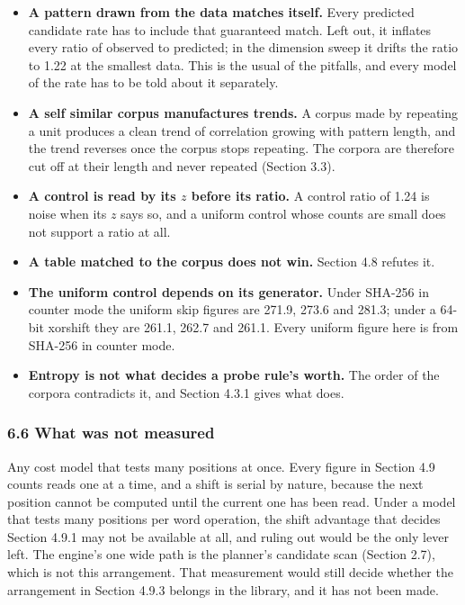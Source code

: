 \begin{itemize}
\item \textbf{A pattern drawn from the data matches itself.} Every predicted candidate rate has to include that guaranteed match. Left out, it inflates every ratio of observed to predicted; in the dimension sweep it drifts the ratio to 1.22 at the smallest data. This is the usual of the pitfalls, and every model of the rate has to be told about it separately.
\item \textbf{A self similar corpus manufactures trends.} A corpus made by repeating a unit produces a clean trend of correlation growing with pattern length, and the trend reverses once the corpus stops repeating. The corpora are therefore cut off at their length and never repeated (Section 3.3).
\item \textbf{A control is read by its \(z\) before its ratio.} A control ratio of 1.24 is noise when its \(z\) says so, and a uniform control whose counts are small does not support a ratio at all.
\item \textbf{A table matched to the corpus does not win.} Section 4.8 refutes it.
\item \textbf{The uniform control depends on its generator.} Under SHA-256 in counter mode the uniform skip figures are 271.9, 273.6 and 281.3; under a 64-bit xorshift they are 261.1, 262.7 and 261.1. Every uniform figure here is from SHA-256 in counter mode.
\item \textbf{Entropy is not what decides a probe rule's worth.} The order of the corpora contradicts it, and Section 4.3.1 gives what does.
\end{itemize}

\subsubsection{6.6 What was not measured}

Any cost model that tests many positions at once. Every figure in Section 4.9 counts reads one at a time, and a shift is serial by nature, because the next position cannot be computed until the current one has been read. Under a model that tests many positions per word operation, the shift advantage that decides Section 4.9.1 may not be available at all, and ruling out would be the only lever left. The engine's one wide path is the planner's candidate scan (Section 2.7), which is not this arrangement. That measurement would still decide whether the arrangement in Section 4.9.3 belongs in the library, and it has not been made.

